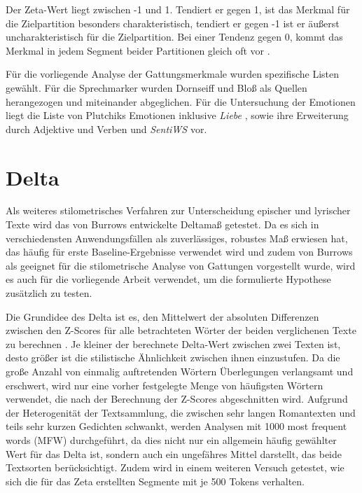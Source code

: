 \documentclass[a4paper,10p]{article}
\begin{document}
 
Der Zeta-Wert liegt zwischen -1 und 1. Tendiert er gegen 1, ist das Merkmal für die Zielpartition besonders charakteristisch, tendiert er gegen -1 ist er äußerst uncharakteristisch für die Zielpartition. Bei einer Tendenz gegen 0, kommt das Merkmal in jedem Segment beider Partitionen gleich oft vor \citep[vgl.][S. 79 f.]{SchöchZeta}.

Für die vorliegende Analyse der Gattungsmerkmale wurden spezifische Listen gewählt. Für die Sprechmarker wurden Dornseiff \citep{Dornseiff2000} und Bloß \cite{Bloß2005} als Quellen herangezogen und miteinander abgeglichen. Für die Untersuchung der Emotionen liegt die Liste von Plutchiks Emotionen inklusive \textit{Liebe} \citep{Plutchik}, sowie ihre Erweiterung durch Adjektive und Verben und \textit{SentiWS} \citep{Sentiws} vor.

\section{Delta}
Als weiteres stilometrisches Verfahren zur Unterscheidung epischer und lyrischer Texte wird das von Burrows entwickelte Deltamaß getestet. Da es sich in verschiedensten Anwendungsfällen als zuverlässiges, robustes Maß erwiesen hat, das häufig für erste Baseline-Ergebnisse verwendet wird und zudem von Burrows als geeignet für die stilometrische Analyse von Gattungen vorgestellt wurde, wird es auch für die vorliegende Arbeit verwendet, um die formulierte Hypothese zusätzlich zu testen.\par 

Die Grundidee des Delta ist es, den Mittelwert der absoluten Differenzen zwischen den Z-Scores für alle betrachteten Wörter der beiden verglichenen Texte zu berechnen \citep[vgl.][S. 17]{Stamatatos}. Je kleiner der berechnete Delta-Wert zwischen zwei Texten ist, desto größer ist die stilistische Ähnlichkeit zwischen ihnen einzustufen. Da die große Anzahl von einmalig auftretenden Wörtern Überlegungen verlangsamt und erschwert, wird nur eine vorher festgelegte Menge von häufigsten Wörtern verwendet, die nach der Berechnung der Z-Scores abgeschnitten wird. Aufgrund der Heterogenität der Textsammlung, die zwischen sehr langen Romantexten und teils sehr kurzen Gedichten schwankt, werden Analysen mit 1000 most frequent words (MFW) durchgeführt, da dies nicht nur ein allgemein häufig gewählter Wert für das Delta ist, sondern auch ein ungefähres Mittel darstellt, das beide Textsorten berücksichtigt. Zudem wird in einem weiteren Versuch getestet, wie sich die für das Zeta erstellten Segmente mit je 500 Tokens verhalten. \par 
\end{document}
